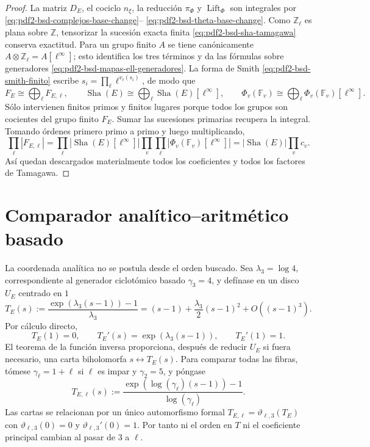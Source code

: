 \begin{proof}
La matriz $D_E$, el cociclo $n_\xi$, la reducción $\pi_\Phi$ y
$\operatorname{Lift}_\Phi$ son integrales por
\eqref{eq:pdf2-bsd-complejos-base-change}--
\eqref{eq:pdf2-bsd-theta-base-change}. Como $\mathbb Z_\ell$ es plana sobre
$\mathbb Z$, tensorizar la sucesión exacta finita
\eqref{eq:pdf2-bsd-sha-tamagawa} conserva exactitud. Para un grupo finito
$A$ se tiene canónicamente
$A\otimes\mathbb Z_\ell=A[\ell^\infty]$; esto identifica los tres términos
y da las fórmulas sobre generadores
\eqref{eq:pdf2-bsd-mapas-ell-generadores}. La forma de Smith
\eqref{eq:pdf2-bsd-smith-finito} escribe
$s_i=\prod_\ell\ell^{v_\ell(s_i)}$, de modo que
\[
 F_E\cong\bigoplus_\ell F_{E,\ell},\qquad
 \operatorname{Sha}(E)\cong
   \bigoplus_\ell\operatorname{Sha}(E)[\ell^\infty],\qquad
 \Phi_v(\mathbb F_v)\cong
   \bigoplus_\ell\Phi_v(\mathbb F_v)[\ell^\infty].
\]
Sólo intervienen finitos primos y finitos lugares porque todos los grupos
son cocientes del grupo finito $F_E$. Sumar las sucesiones primarias recupera
la integral. Tomando órdenes primero primo a primo y luego multiplicando,
\begin{equation}\label{eq:pdf2-bsd-cardinal-sts-todos-ell}
 \prod_\ell|F_{E,\ell}|
 =\prod_\ell|\operatorname{Sha}(E)[\ell^\infty]|
   \prod_v\prod_\ell|\Phi_v(\mathbb F_v)[\ell^\infty]|
 =|\operatorname{Sha}(E)|\prod_vc_v.
\end{equation}
Así quedan descargados materialmente todos los coeficientes y todos los
factores de Tamagawa.
\end{proof}

\section{Comparador analítico--aritmético basado}

La coordenada analítica no se postula desde el orden buscado. Sea
$\lambda_3=\log4$, correspondiente al generador ciclotómico basado
$\gamma_3=4$, y defínase en un disco $U_E$ centrado en $1$
\begin{equation}\label{eq:pdf2-bsd-t-e-construido}
 T_E(s):=\frac{\exp(\lambda_3(s-1))-1}{\lambda_3}
 =(s-1)+\frac{\lambda_3}{2}(s-1)^2+O((s-1)^3).
\end{equation}
Por cálculo directo,
\begin{equation}\label{eq:pdf2-bsd-t-e-normalizacion-probada}
 T_E(1)=0,
 \qquad T_E'(s)=\exp(\lambda_3(s-1)),
 \qquad T_E'(1)=1.
\end{equation}
El teorema de la función inversa proporciona, después de reducir $U_E$ si
fuera necesario, una carta biholomorfa $s\leftrightarrow T_E(s)$.
Para comparar todas las fibras, tómese
$\gamma_\ell=1+\ell$ si $\ell$ es impar y $\gamma_2=5$, y póngase
\begin{equation}\label{eq:pdf2-bsd-t-ell-construido}
 T_{E,\ell}(s):=
 \frac{\exp(\log(\gamma_\ell)(s-1))-1}{\log(\gamma_\ell)}.
\end{equation}
Las cartas se relacionan por un único automorfismo formal
$T_{E,\ell}=\vartheta_{\ell,3}(T_E)$ con
$\vartheta_{\ell,3}(0)=0$ y $\vartheta_{\ell,3}'(0)=1$. Por tanto ni el
orden en $T$ ni el coeficiente principal cambian al pasar de $3$ a $\ell$.

